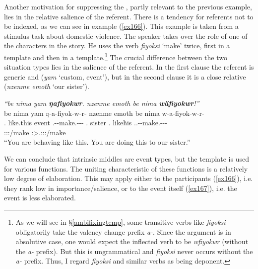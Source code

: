 Another motivation for suppressing the , partly relevant to the previous example, lies in the relative salience of the referent. There is a tendency for  referents not to be indexed, as we can see in example (\ref{ex166}). This example is taken from a stimulus task about domestic violence. The speaker takes over the role of one of the characters in the story. He uses the verb \emph{fiyoksi} `make' twice, first in a  template and then in a  template.\footnote{As we will see in \S{}\ref{ambifixingtemp}, some transitive verbs like \emph{fiyoksi} obligatorily take the valency change prefix \emph{a-}. Since the argument is in absolutive case, one would expect the inflected verb to be \emph{wfiyokwr} (without the \emph{a-} prefix). But this is ungrammatical and \emph{fiyoksi} never occurs without the \emph{a-} prefix. Thus, I regard \emph{fiyoksi} and similar verbs as being deponent.} The crucial difference between the two situation types lies in the salience of the referent. In the first clause the referent is generic and  (\emph{yam} `custom, event'), but in the second clause it is a close relative (\emph{nzenme emoth} `our sister').

\begin{exe}
	\ex \emph{``be nima yam \textbf{ŋafiyokwr}. nzenme emoth be nima \textbf{wäfiyokwr}!''}\\
	\glll be nima yam ŋ-a-fiyok-w-r-\Zero{} nzenme emoth be nima w-a-fiyok-w-r-\Zero{}\\
	\Ssg.\Erg{} like.this event \M.\Alph-\Vc-make.\Ext-\Ndu-\Lk-\Stsg{} \Fnsg.\Poss{} sister \Ssg.\Erg{} like\.his \Tsg.\F.\Alph-\Vc-make.\Ext-\Ndu-\Lk-\Stsg\\
	{} {} {} \footnotesize{\Stsg:\Sbj:\Nonpast:\Ipfv/make} {} {} {} {} \footnotesize{\Stsg:\Sbj>\Tsg.\F:\Obj:\Nonpast:\Ipfv/make}\\
	\trans ``You are behaving like this. You are doing this to our sister.''\\
	\label{ex166}
\end{exe}

We can conclude that intrinsic middles are  event types, but the  template is used for various functions. The uniting characteristic of these functions is a relatively low degree of elaboration. This may apply either to the participants (\ref{ex166}), i.e. they rank low in importance/salience, or to the event itself (\ref{ex167}), i.e. the event is less elaborated.

